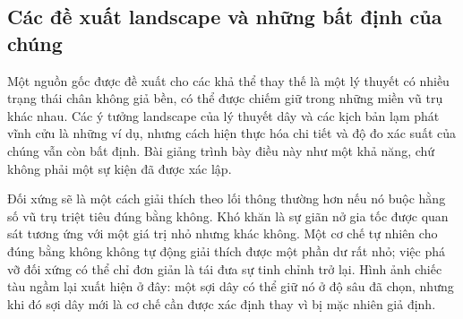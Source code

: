\subsection{Các đề xuất landscape và những bất định của chúng}

Một nguồn gốc được đề xuất cho các khả thể thay thế là một lý thuyết có nhiều trạng thái chân không giả bền, có thể được chiếm giữ trong những miền vũ trụ khác nhau. Các ý tưởng landscape của lý thuyết dây và các kịch bản lạm phát vĩnh cửu là những ví dụ, nhưng cách hiện thực hóa chi tiết và độ đo xác suất của chúng vẫn còn bất định. Bài giảng trình bày điều này như một khả năng, chứ không phải một sự kiện đã được xác lập.

Đối xứng sẽ là một cách giải thích theo lối thông thường hơn nếu nó buộc hằng số vũ trụ triệt tiêu đúng bằng không. Khó khăn là sự giãn nở gia tốc được quan sát tương ứng với một giá trị nhỏ nhưng khác không. Một cơ chế tự nhiên cho đúng bằng không không tự động giải thích được một phần dư rất nhỏ; việc phá vỡ đối xứng có thể chỉ đơn giản là tái đưa sự tinh chỉnh trở lại. Hình ảnh chiếc tàu ngầm lại xuất hiện ở đây: một sợi dây có thể giữ nó ở độ sâu đã chọn, nhưng khi đó sợi dây mới là cơ chế cần được xác định thay vì bị mặc nhiên giả định.

\begin{classroomqa}
\end{classroomqa}

\begin{classroomqa}
\end{classroomqa}

